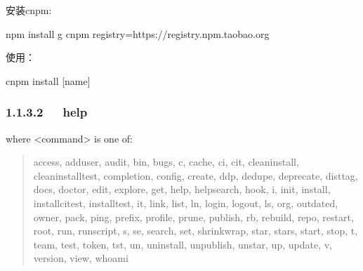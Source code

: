 \documentclass[letterpaper,12pt,english]{sphinxmanual}
\begin{document}
安装cnpm:

\begin{sphinxVerbatim}[commandchars=\\\{\}]
\PYGZdl{} npm install \PYGZhy{}g cnpm \PYGZhy{}\PYGZhy{}registry=https://registry.npm.taobao.org
\end{sphinxVerbatim}

使用：

\begin{sphinxVerbatim}[commandchars=\\\{\}]
\PYGZdl{} cnpm install [name]
\end{sphinxVerbatim}


\subsubsection{1.1.3.2   help}
\label{\detokenize{001software/001install/001._u7f51_u7ad9/nodeJs:help}}
where <command> is one of:
\begin{quote}

access, adduser, audit, bin, bugs, c, cache, ci, cit,
clean\sphinxhyphen{}install, clean\sphinxhyphen{}install\sphinxhyphen{}test, completion, config,
create, ddp, dedupe, deprecate, dist\sphinxhyphen{}tag, docs, doctor,
edit, explore, get, help, help\sphinxhyphen{}search, hook, i, init,
install, install\sphinxhyphen{}ci\sphinxhyphen{}test, install\sphinxhyphen{}test, it, link, list, ln,
login, logout, ls, org, outdated, owner, pack, ping, prefix,
profile, prune, publish, rb, rebuild, repo, restart, root,
run, run\sphinxhyphen{}script, s, se, search, set, shrinkwrap, star,
stars, start, stop, t, team, test, token, tst, un,
uninstall, unpublish, unstar, up, update, v, version, view,
whoami
\end{quote}

\begin{sphinxVerbatim}[commandchars=\\\{\}]
       
                
         
         

   
\end{sphinxVerbatim}
\end{document}
